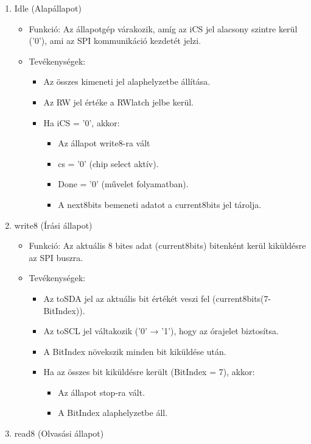 \documentclass[a4paper,12pt,oneside]{book}
\begin{document}
\begin{enumerate}
	\item Idle (Alapállapot) \begin{itemize}
		\item Funkció: Az állapotgép várakozik, amíg az iCS jel alacsony szintre kerül ('0'), ami az SPI kommunikáció kezdetét jelzi.
		\item Tevékenységek: \begin{itemize}
			\item Az összes kimeneti jel alaphelyzetbe állítása.
			\item Az RW jel értéke a RWlatch jelbe kerül.
			\item Ha iCS = '0', akkor: \begin{itemize}
				\item Az állapot write8-ra vált
				\item cs = '0' (chip select aktív).
				\item Done = '0' (művelet folyamatban).
				\item A next8bits bemeneti adatot a current8bits jel tárolja.
			\end{itemize}
		\end{itemize}
	\end{itemize}
	\item write8 (Írási állapot) \begin{itemize}
		\item Funkció: Az aktuális 8 bites adat (current8bits) bitenként kerül kiküldésre az SPI buszra.
		\item Tevékenységek: \begin{itemize}
			\item Az toSDA jel az aktuális bit értékét veszi fel (current8bits(7-BitIndex)).
			\item Az toSCL jel váltakozik ('0' → '1'), hogy az órajelet biztosítsa.
			\item A BitIndex növekszik minden bit kiküldése után.
			\item Ha az összes bit kiküldésre került (BitIndex = 7), akkor: \begin{itemize}
				\item Az állapot stop-ra vált.
				\item A BitIndex alaphelyzetbe áll.
			\end{itemize}
		\end{itemize}
	\end{itemize}
	\item read8 (Olvasási állapot) \begin{itemize}

\end{itemize}
\end{enumerate}
\end{document}
